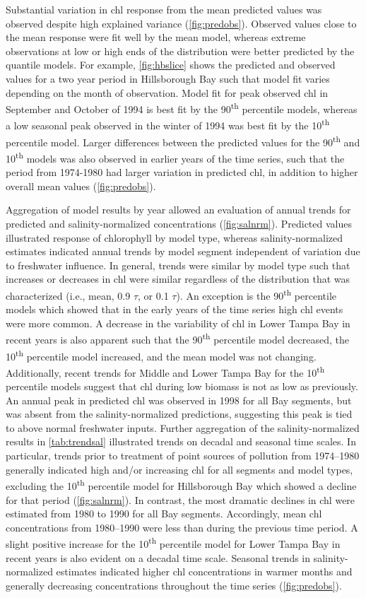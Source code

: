 \documentclass{svjour3}\usepackage[]{graphicx}\usepackage[]{color}
\newcommand{\nine}{90\textsuperscript{th} percentile }
\newcommand{\ten}{10\textsuperscript{th} percentile }
\begin{document}
Substantial variation in \ac{chl} response from the mean predicted values was observed despite high explained variance (\cref{fig:predobs}).  Observed values close to the mean response were fit well by the mean model, whereas extreme observations at low or high ends of the distribution were better predicted by the quantile models. For example, \cref{fig:hbslice} shows the predicted and observed values for a two year period in Hillsborough Bay such that model fit varies depending on the month of observation.  Model fit for peak observed \ac{chl} in September and October of 1994 is best fit by the \nine models, whereas a low seasonal peak observed in the winter of 1994 was best fit by the \ten model.  Larger differences between the predicted values for the 90\textsuperscript{th} and 10\textsuperscript{th} models was also observed in earlier years of the time series, such that the period from 1974-1980 had larger variation in predicted \ac{chl}, in addition to higher overall mean values (\cref{fig:predobs}).  

Aggregation of model results by year allowed an evaluation of annual trends for predicted and salinity-normalized concentrations (\cref{fig:salnrm}).  Predicted values illustrated response of chlorophyll by model type, whereas salinity-normalized estimates indicated annual trends by model segment independent of variation due to freshwater influence.  In general, trends were similar by model type such that increases or decreases in \ac{chl} were similar regardless of the distribution that was characterized (i.e., mean, 0.9 $\tau$, or 0.1 $\tau$).  An exception is the \nine models which showed that in the early years of the time series high \ac{chl} events were more common.  A decrease in the variability of \ac{chl} in Lower Tampa Bay in recent years is also apparent such that the \nine model decreased, the \ten model increased, and the mean model was not changing.  Additionally, recent trends for Middle and Lower Tampa Bay for the \ten models suggest that \ac{chl} during low biomass is not as low as previously.  An annual peak in predicted \ac{chl} was observed in 1998 for all Bay segments, but was absent from the salinity-normalized predictions, suggesting this peak is tied to above normal freshwater inputs. Further aggregation of the salinity-normalized results in \cref{tab:trendsal} illustrated trends on decadal and seasonal time scales.  In particular, trends prior to treatment of point sources of pollution from 1974--1980 generally indicated high and/or increasing \ac{chl} for all segments and model types, excluding the \ten model for Hillsborough Bay which showed a decline for that period (\cref{fig:salnrm}).  In contrast, the most dramatic declines in \ac{chl} were estimated from 1980 to 1990 for all Bay segments.  Accordingly, mean \ac{chl} concentrations from 1980--1990 were less than during the previous time period.  A slight positive increase for the \ten model for Lower Tampa Bay in recent years is also evident on a decadal time scale.  Seasonal trends in salinity-normalized estimates indicated higher \ac{chl} concentrations in warmer months and generally decreasing concentrations throughout the time series (\cref{fig:predobs}).
\end{document}
